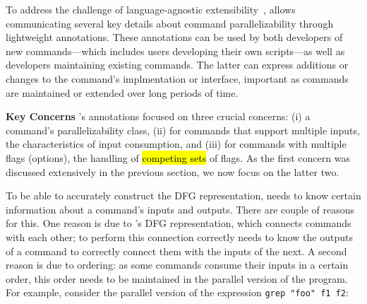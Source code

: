\documentclass[letterpaper,twocolumn,10pt]{article}
\newcommand{\heading}[1]{\vspace{4pt}\noindent\textbf{#1}\enspace}
\newcommand{\ttt}[1]{\texttt{#1}}
\newcommand{\todo}[1]{\hl{#1}\xspace}
\newcommand{\nv}[1]{[{\color{cyan}nv: #1}]}
\newcommand{\kk}[1]{[{\color{magenta}kk: #1}]}
\begin{document}

To address the challenge of language-agnostic extensibility~, \sys allows communicating several key details about command parallelizability through lightweight annotations.
These annotations can be used by both developers of new commands---which includes users developing their own scripts---as well as developers maintaining existing commands.
The latter can express additions or changes to the command's implmentation or interface, important as commands are maintained or extended over long periods of time.

\heading{Key Concerns}
\sys's annotations focused on three crucial concerns:
  (i) a command's parallelizability class,
  (ii) for commands that support multiple inputs, the characteristics of input consumption, and
  (iii) for commands with multiple flags (options), the handling of \todo{competing sets} of flags.
As the first concern was discussed extensively in the previous section, we now focus on the latter two.

To be able to accurately construct the DFG representation, \sys needs to know certain information about a command's inputs and outputs.
There are couple of reasons for this.
One reason is due to \sys's DFG representation, which connects commands with each other;
  to perform this connection correctly \sys needs to know the outputs of a command to correctly connect them with the inputs of the next.
A second reason is due to ordering:
  as some commands consume their inputs in a certain order, this order needs to be maintained in the parallel version of the program.
For example, consider the parallel version of the expression \ttt{grep "foo" f1 f2}:
\end{document}
